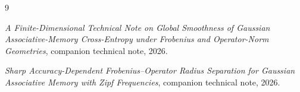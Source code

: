 \documentclass[11pt]{article}
\begin{document}
\begin{thebibliography}{9}

\emph{A Finite-Dimensional Technical Note on Global Smoothness of
Gaussian Associative-Memory Cross-Entropy under Frobenius and
Operator-Norm Geometries}, companion technical note, 2026.

\emph{Sharp Accuracy-Dependent Frobenius--Operator Radius Separation
for Gaussian Associative Memory with Zipf Frequencies}, companion
technical note, 2026.

\end{thebibliography}
\end{document}

